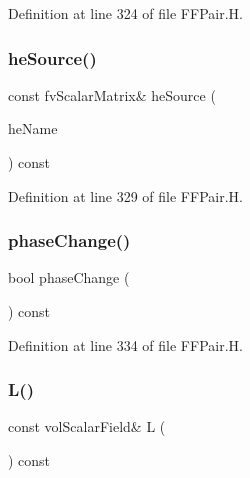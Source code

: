 Definition at line 324 of file F\+F\+Pair.\+H.

\mbox{\label{classFoam_1_1FFPair_a648cf9d2ac10af5edf764413c377d3f3}} 
\subsubsection{\texorpdfstring{he\+Source()}{heSource()}}
{\footnotesize\ttfamily const fv\+Scalar\+Matrix\& he\+Source (\begin{DoxyParamCaption}\item[{const word \&}]{he\+Name }\end{DoxyParamCaption}) const\hspace{0.3cm}{\ttfamily [inline]}}



Definition at line 329 of file F\+F\+Pair.\+H.

\mbox{\label{classFoam_1_1FFPair_a734047908162ee80a71312f73aaf8193}} 
\subsubsection{\texorpdfstring{phase\+Change()}{phaseChange()}}
{\footnotesize\ttfamily bool phase\+Change (\begin{DoxyParamCaption}{ }\end{DoxyParamCaption}) const\hspace{0.3cm}{\ttfamily [inline]}}



Definition at line 334 of file F\+F\+Pair.\+H.

\mbox{\label{classFoam_1_1FFPair_abe53da7ab6885a0c606832841d7bb49f}} 
\subsubsection{\texorpdfstring{L()}{L()}}
{\footnotesize\ttfamily const vol\+Scalar\+Field\& L (\begin{DoxyParamCaption}{ }\end{DoxyParamCaption}) const\hspace{0.3cm}{\ttfamily [inline]}}



